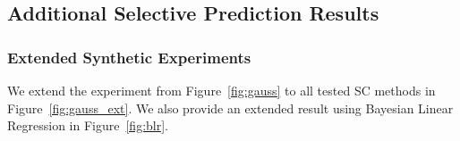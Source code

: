 \subsection{Additional Selective Prediction Results}
\label{app:add_exp}




\subsubsection{Extended Synthetic Experiments}

We extend the experiment from Figure~\ref{fig:gauss} to all tested SC methods in Figure~\ref{fig:gauss_ext}. We also provide an extended result using Bayesian Linear Regression in Figure~\ref{fig:blr}.

